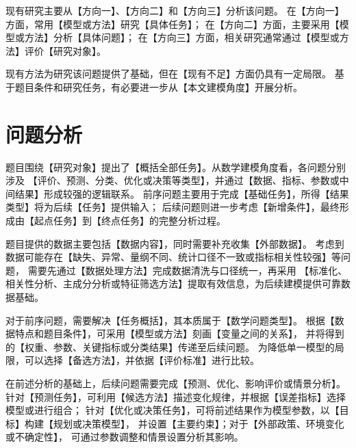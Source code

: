 \documentclass[withoutpreface,bwprint]{cumcmthesis}
\begin{document}
现有研究主要从【方向一】、【方向二】和【方向三】分析该问题。
在【方向一】方面，常用【模型或方法】研究【具体任务】；
在【方向二】方面，主要采用【模型或方法】分析【具体问题】；
在【方向三】方面，相关研究通常通过【模型或方法】评价【研究对象】。

现有方法为研究该问题提供了基础，但在【现有不足】方面仍具有一定局限。
基于题目条件和研究任务，有必要进一步从【本文建模角度】开展分析。

\newpage

\section{问题分析}

题目围绕【研究对象】提出了【概括全部任务】。从数学建模角度看，各问题分别涉及
【评价、预测、分类、优化或决策等类型】，并通过【数据、指标、参数或中间结果】形成较强的逻辑联系。
前序问题主要用于完成【基础任务】，所得【结果类型】将为后续【任务】提供输入；
后续问题则进一步考虑【新增条件】，最终形成由【起点任务】到【终点任务】的完整分析过程。

题目提供的数据主要包括【数据内容】，同时需要补充收集【外部数据】。
考虑到数据可能存在【缺失、异常、量纲不同、统计口径不一致或指标相关性较强】等问题，
需要先通过【数据处理方法】完成数据清洗与口径统一，再采用
【标准化、相关性分析、主成分分析或特征筛选方法】提取有效信息，为后续建模提供可靠数据基础。

对于前序问题，需要解决【任务概括】，其本质属于【数学问题类型】。
根据【数据特点和题目条件】，可采用【模型或方法】刻画【变量之间的关系】，
并将得到的【权重、参数、关键指标或分类结果】传递至后续问题。
为降低单一模型的局限，可以选择【备选方法】，并依据【评价标准】进行比较。

在前述分析的基础上，后续问题需要完成【预测、优化、影响评价或情景分析】。
针对【预测任务】，可利用【候选方法】描述变化规律，并根据【误差指标】选择模型或进行组合；
针对【优化或决策任务】，可将前述结果作为模型参数，以【目标】构建【规划或决策模型】，
并设置【主要约束】；对于【外部政策、环境变化或不确定性】，
可通过参数调整和情景设置分析其影响。
\end{document}
